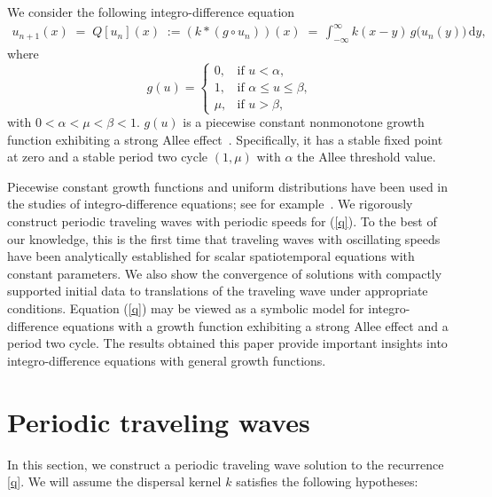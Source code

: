 \documentclass[11pt]{article}
\theoremstyle{definition}
\newtheorem{hyp}[thm]{Hypothesis}
\numberwithin{equation}{section}
\numberwithin{thm}{section}
\renewcommand{\a}{\alpha}
\renewcommand{\b}{\beta}
\newcommand{\m}{\mu}
\begin{document}
We consider the following integro-difference equation
\begin{align}\label{q}
u_{n+1}(x)\;=\;Q[u_n](x)\;:=(k*(g\circ u_n))(x)\;=\,\int^{\infty}_{-\infty}k(x-y)\,g\big(u_n(y)\big)\,\mathrm{d}y,
\end{align}
where 
\begin{equation} \label{g}
g(u) = \begin{cases}
0, & \text{if } u < \a, \\
1, & \text{if } \a \leq u \leq \b, \\
\m, & \text{if } u > \b,
\end{cases}
\end{equation}
with $0<\a<\m<\b<1$. $g(u)$ is a piecewise constant nonmonotone growth function exhibiting a strong Allee effect~\cite{all}. Specifically, it has a stable fixed point at zero and a stable period two cycle $(1,\m)$ with $\a$ the Allee threshold value.

Piecewise constant growth functions and uniform distributions have been used in the studies of integro-difference equations; see for example~\cite{kot1, lut,otto,  pnas}. We rigorously construct periodic traveling waves with periodic speeds for (\ref{q}). To the best of our knowledge, this is the first time that traveling waves with oscillating speeds have been analytically established  for scalar spatiotemporal equations with constant parameters. We also show the convergence of solutions with compactly supported initial data to translations of the traveling wave under appropriate conditions. Equation (\ref{q}) may be viewed as a symbolic model for integro-difference equations with a growth function exhibiting a strong Allee effect and a period two cycle. The results obtained this paper provide important insights into integro-difference equations with general growth functions. 


\section{Periodic traveling waves}

In this section, we construct a periodic traveling wave solution to the recurrence \eqref{q}. We will assume the dispersal kernel $k$ satisfies the following hypotheses:

\def\Hone{(\text{H1})}
\def\Htwo{(\text{H2})}
\def\Hthree{(\text{H3})}
\def\Hfour{(\text{H4})}

\end{document}
